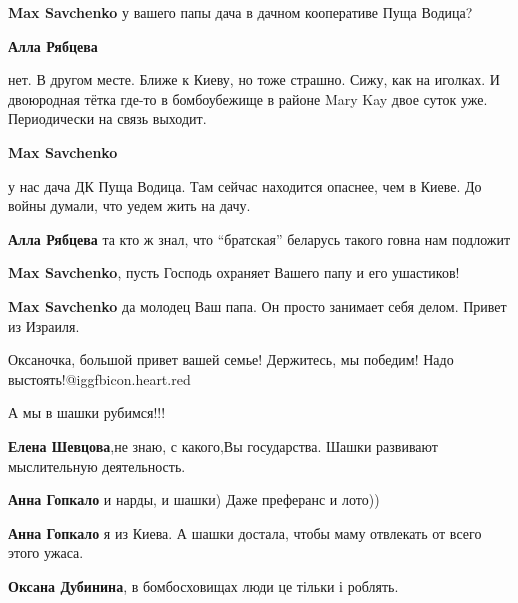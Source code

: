\begin{itemize}
\textbf{Max Savchenko} у вашего папы дача в дачном кооперативе Пуща Водица?

\begin{itemize} %
\textbf{Алла Рябцева} 

нет. В другом месте. Ближе к Киеву, но тоже страшно. Сижу, как на иголках. И
двоюродная тётка где-то в бомбоубежище в районе Mary Kay двое суток уже.
Периодически на связь выходит.

\textbf{Max Savchenko} 

у нас дача ДК Пуща Водица. Там сейчас находится опаснее, чем в Киеве. До войны
думали, что уедем жить на дачу.

\textbf{Алла Рябцева} та кто ж знал, что \enquote{братская} беларусь такого говна нам подложит
\end{itemize} %

\textbf{Max Savchenko}, пусть Господь охраняет Вашего папу и его ушастиков!

\textbf{Max Savchenko} да молодец Ваш папа. Он просто занимает себя делом. Привет из Израиля.

\end{itemize} %


Оксаночка, большой привет вашей семье! Держитесь, мы победим! Надо
выстоять!@igg{fbicon.heart.red}

А мы в шашки рубимся!!!

\begin{itemize} %
\textbf{Елена Шевцова},не знаю, с какого,Вы государства. Шашки развивают мыслительную деятельность.

\textbf{Анна Гопкало} и нарды, и шашки) Даже преферанс и лото))

\textbf{Анна Гопкало} я из Киева. А шашки достала, чтобы маму отвлекать от всего этого ужаса.

\textbf{Оксана Дубинина}, в бомбосховищах люди це тільки і роблять.
\end{itemize} %
